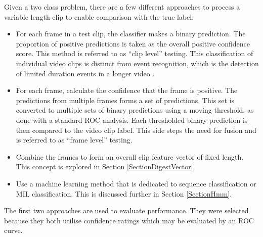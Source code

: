 Given a two class problem, there are a few different approaches to process a variable length clip to enable comparison with the true label:

\begin{itemize}
 \item For each frame in a test clip, the classifier makes a binary prediction. The proportion of positive predictions is taken as the overall positive confidence score. 
 This method is referred to as ``clip level'' testing. This classification of individual video clips is distinct from event recognition, which is the detection of limited duration events in a longer video \cite{Jiang2012}.
 \item For each frame, calculate the confidence that the frame is positive. The predictions from multiple frames forms a set of predictions. This set is converted to multiple sets of binary predictions using a  moving threshold, as done with a standard \ac{ROC} analysis. Each thresholded binary prediction is then compared to the video clip label. This side steps the need for fusion and is referred to as ``frame level'' testing.
 \item Combine the frames to form an overall clip feature vector of fixed length. This concept is explored in Section \ref{SectionDigestVector}.
 \item Use a machine learning method that is dedicated to sequence classification or \ac{MIL} classification. This is discussed further in Section \ref{SectionHmm}. %
\end{itemize}

The first two approaches are used to evaluate performance. They were selected because they both utilise confidence ratings which may be evaluated by an \ac{ROC} curve. %

